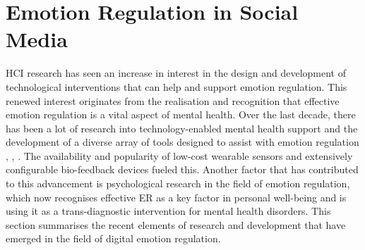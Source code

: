 \documentclass[lettersize,journal]{IEEEtran}
\begin{document}
\section{Emotion Regulation in Social Media}
HCI research has seen an increase in interest in the design and development of technological interventions that can help and support emotion regulation. This renewed interest originates from the realisation and recognition that effective emotion regulation is a vital aspect of mental health. Over the last decade, there has been a lot of research into technology-enabled mental health support and the development of a diverse array of tools designed to assist with emotion regulation \cite{wadley2020digital}, \cite{smith2022digital}, \cite{slovak2022designing}. The availability and popularity of low-cost wearable sensors and extensively configurable bio-feedback devices fueled this. Another factor that has contributed to this advancement is psychological research in the field of emotion regulation, which now recognises effective ER as a key factor in personal well-being and is using it as a trans-diagnostic intervention for mental health disorders. This section summarises the recent elements of research and development that have emerged in the field of digital emotion regulation. 
\end{document}
